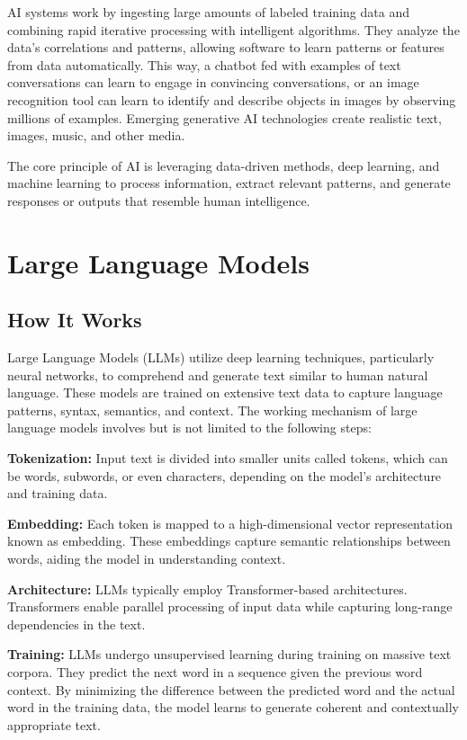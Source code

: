 \documentclass[
]{book}
\begin{document}
AI systems work by ingesting large amounts of labeled training data and combining rapid iterative processing with intelligent algorithms. They analyze the data's correlations and patterns, allowing software to learn patterns or features from data automatically. This way, a chatbot fed with examples of text conversations can learn to engage in convincing conversations, or an image recognition tool can learn to identify and describe objects in images by observing millions of examples. Emerging generative AI technologies create realistic text, images, music, and other media.

The core principle of AI is leveraging data-driven methods, deep learning, and machine learning to process information, extract relevant patterns, and generate responses or outputs that resemble human intelligence.

\hypertarget{large-language-models}{%
\section{Large Language Models}\label{large-language-models}}

\hypertarget{how-it-works-1}{%
\subsection{How It Works}\label{how-it-works-1}}

Large Language Models (LLMs) utilize deep learning techniques, particularly neural networks, to comprehend and generate text similar to human natural language. These models are trained on extensive text data to capture language patterns, syntax, semantics, and context. The working mechanism of large language models involves but is not limited to the following steps:

\textbf{Tokenization:} Input text is divided into smaller units called tokens, which can be words, subwords, or even characters, depending on the model's architecture and training data.

\textbf{Embedding:} Each token is mapped to a high-dimensional vector representation known as embedding. These embeddings capture semantic relationships between words, aiding the model in understanding context.

\textbf{Architecture:} LLMs typically employ Transformer-based architectures. Transformers enable parallel processing of input data while capturing long-range dependencies in the text.

\textbf{Training:} LLMs undergo unsupervised learning during training on massive text corpora. They predict the next word in a sequence given the previous word context. By minimizing the difference between the predicted word and the actual word in the training data, the model learns to generate coherent and contextually appropriate text.
\end{document}
